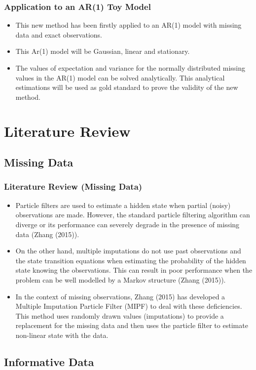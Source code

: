 \documentclass[9pt]{beamer}
\begin{document}
\begin{frame}
\frametitle{Application to an AR(1) Toy Model}
\begin{itemize}
\setlength\itemsep{2em}
\item This new method has been firstly applied to an AR(1) model with missing data and exact observations.
\item This Ar(1) model will be Gaussian, linear and stationary.
\item The values of expectation and variance for the normally distributed missing values in the AR(1) model can be solved analytically. This analytical estimations will be used as gold standard to prove the validity of the new method.
\end{itemize}
\end{frame}

\section{Literature Review }
\subsection{Missing Data}

\begin{frame}
\frametitle{Literature Review (Missing Data)}
\begin{itemize}
\setlength\itemsep{2em}
\item Particle filters are used to estimate a hidden state when partial (noisy) observations are made. However, the standard particle filtering algorithm can diverge or its performance can severely degrade in the presence of missing data (Zhang (2015)).
\item On the other hand, multiple imputations do not use past observations and the state transition equations when estimating the probability of the hidden state knowing the observations. This can result in poor performance when the problem can be well modelled by a Markov structure (Zhang (2015)).
\item In the context of missing observations, Zhang (2015) has developed a Multiple Imputation Particle Filter (MIPF) to deal with these deficiencies. This method uses randomly drawn values (imputations) to provide a replacement for the missing data and then uses the particle filter to estimate non-linear state with the data.
\end{itemize}
\end{frame}

\subsection{Informative Data}
\end{document}
